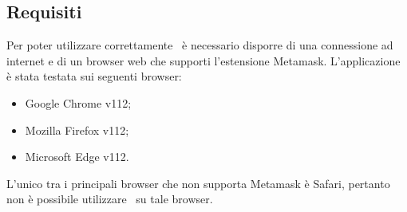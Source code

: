 \subsection{Requisiti}
Per poter utilizzare correttamente \capName\ è necessario disporre di una connessione ad internet e di un browser web che supporti l'estensione Metamask. L'applicazione è stata testata sui seguenti browser:
\begin{itemize}
    \item Google Chrome v112;
    \item Mozilla Firefox v112;
    \item Microsoft Edge v112.
\end{itemize}
L'unico tra i principali browser che non supporta Metamask è Safari, pertanto non è possibile utilizzare \capName\ su tale browser.